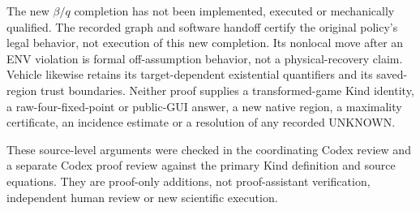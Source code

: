The new $\beta/q$ completion has not been implemented, executed or mechanically
qualified. The recorded graph and software handoff certify the original
policy's legal behavior, not execution of this new completion.
Its nonlocal move after an ENV violation is formal off-assumption behavior,
not a physical-recovery claim. Vehicle likewise retains its target-dependent
existential quantifiers and its saved-region trust boundaries.
Neither proof supplies a transformed-game Kind identity, a raw-four-fixed-point
or public-GUI answer, a new native region, a maximality certificate,
an incidence estimate or a resolution of any recorded UNKNOWN.

These source-level arguments were checked in the coordinating Codex review
and a separate Codex proof review against the primary Kind definition and
source equations. They are proof-only additions, not proof-assistant
verification, independent human review or new scientific execution.

